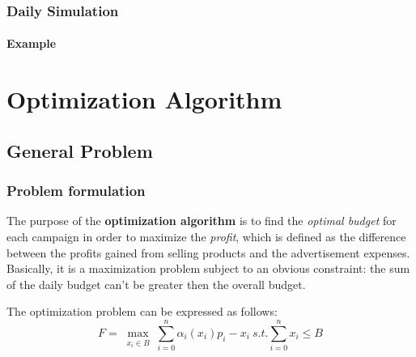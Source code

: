 \documentclass[11pt]{beamer}
\begin{document}

\begin{frame}

\frametitle{Daily Simulation}
\framesubtitle{Example}


\end{frame}


\AtBeginSection[]
{
\begin{frame}{}
    \tableofcontents[sections={\thesection}]
\end{frame}
}


\section{Optimization Algorithm}


\subsection{General Problem}


\begin{frame}

\frametitle{Problem formulation}

The purpose of the \textbf{optimization algorithm} is to find the \textit{optimal budget} for each campaign in order to maximize the \textit{profit}, which is defined as the difference between the profits gained from selling products and the advertisement expenses.
Basically, it is a maximization problem subject to an obvious constraint: the sum of the daily budget can't be greater then the overall budget.

The optimization problem can be expressed as follows:
\begin{displaymath}
F=\max_{\substack{x_i\in B}} \sum_{i=0}^n \alpha_i(x_i)p_i-x_i \ s.t. \sum_{i=0}^n x_i\leq B
\end{displaymath}

\end{frame}

\end{document}
